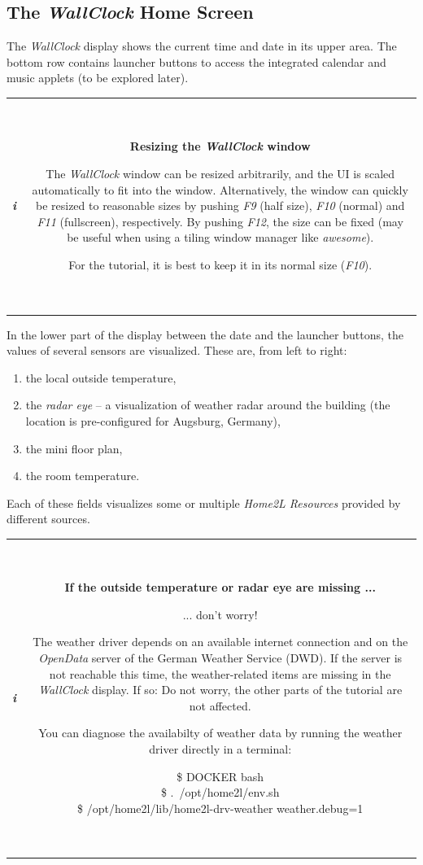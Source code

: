 \documentclass[12pt,english,parskip=half,headheight=19pt]{scrreprt}
\newcommand{\lstbox}[1]{
  \par
  \colorbox{lstbackground}{\ttfamily\footnotesize{\parbox{\linewidth}{#1}}}
  \par
}
\newcommand{\infobox}[1]{
  \par
  \medskip
  \hfill
  \setlength\arrayrulewidth{1pt}
  \begin{tabular}[t]{c|c|}
    \parbox{1.8em}{\hfill\textit{\Huge\textbf{i}\,}}
    &
    \,\parbox{0.89\linewidth}{\setlength{\parskip}{0.5em} \small #1}\,
  \end{tabular}
  \medskip
  \par
}
\begin{document}
\subsection{The \textit{WallClock} Home Screen}
\label{sec:tutorial-firststeps-wallclock}

The \textit{WallClock} display shows the current time and date in its upper area. The bottom row contains launcher buttons to access the integrated calendar and music applets (to be explored later).

\infobox{
  \textbf{Resizing the \textit{WallClock} window}

  The \textit{WallClock} window can be resized arbitrarily, and the UI is scaled automatically
  to fit into the window. Alternatively, the window can quickly be resized to
  reasonable sizes by pushing \textit{F9} (half size), \textit{F10} (normal) and
  \textit{F11} (fullscreen), respectively. By pushing \textit{F12}, the size can be fixed
  (may be useful when using a tiling window manager like \textit{awesome}).

  For the tutorial, it is best to keep it in its normal size (\textit{F10}).
}

In the lower part of the display between the date and the launcher buttons, the values of several sensors are visualized. These are, from left to right:

\begin{enumerate}
  \item the local outside temperature,
  \item the \textit{radar eye} -- a visualization of weather radar around the building
    (the location is pre-configured for Augsburg, Germany),
  \item the mini floor plan,
  \item the room temperature.
\end{enumerate}

Each of these fields visualizes some or multiple \textit{Home2L Resources} provided by different sources.

\infobox{
  \textbf{If the outside temperature or radar eye are missing ...}

  ... don't worry!

  The weather driver depends on an available internet connection and on the \textit{OpenData} server of
  the German Weather Service (DWD). If the server is not reachable this time, the weather-related items 
  are missing in the \textit{WallClock} display. 
  If so: Do not worry, the other parts of the tutorial are not affected.

  You can diagnose the availabilty of weather data by running the weather driver directly
  in a terminal:
  \lstbox{
    \$ DOCKER bash \\
    \$ .~/opt/home2l/env.sh \\
    \$ /opt/home2l/lib/home2l-drv-weather weather.debug=1
  }
}
\end{document}
